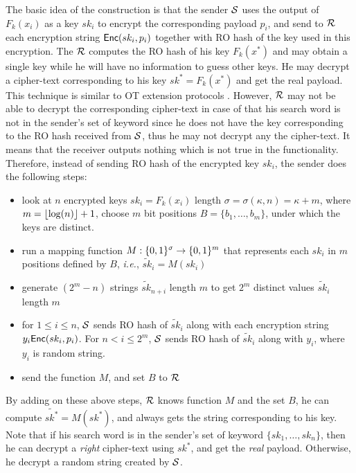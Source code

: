 The basic idea of the \SSOT construction is that the sender $\mathcal{S}$ uses the output of $F_k(x_i)$ as a key $sk_i$ to encrypt the corresponding payload $p_i$, and send to $\mathcal{R}$ each encryption string $\mathsf{Enc}(sk_i,p_i)$ together with RO hash of the key used in this encryption.  The $\mathcal{R}$ computes the RO hash of his key $F_k(x^*)$ and may obtain a single key while he will have no information to guess other keys. He may decrypt a cipher-text corresponding to his key $sk^*=F_k(x^*)$ and get the real payload.   This technique is similar to OT extension protocols  \cite{C:IKNP03,C:KolKum13}. However, $\mathcal{R}$ may not be able to decrypt the corresponding cipher-text in case of that his search word is not in the sender's set of keyword since he does not have the key corresponding to the RO hash received from $\mathcal{S}$, thus he may not decrypt any the cipher-text. It means that the receiver outputs nothing which is not true in the \SSOT functionality. Therefore, instead of sending RO hash of the encrypted key $sk_i$, the sender does the following steps:
\begin{itemize}
	\item look at $n$ encrypted keys $sk_i=F_k(x_i)$ length $\sigma=\sigma(\kappa,n)=\kappa+m$, where $m={\lfloor{\log(n)}\rfloor}+1$, choose $m$ bit positions $B=\{b_1,  \ldots, b_m\}$, under which the keys are distinct.%
	\item run a mapping function $M: \{0,1\}^\sigma \rightarrow \{0,1\}^m$ that represents each $sk_i$ in $m$ positions defined by $B$, \textit{i.e.}, $\tilde{sk}_{i}=M(sk_i)$
	\item generate $(2^m-n)$ strings $\tilde{sk}_{n+i}$ length $m$ to get $2^m$ distinct values $\tilde{sk}_{i}$ length $m$
	\item for $1\leq i \leq n$, $\mathcal{S}$ sends RO hash of $\tilde{sk}_{i}$ along with each encryption string $y_i\mathsf{Enc}(sk_i,p_i)$. For $n < i \leq 2^m$, $\mathcal{S}$ sends RO hash of $\tilde{sk}_{i}$ along with $y_i$, where $y_i$ is random string.
	\item send the function $M$, and set $B$	to $\mathcal{R}$
\end{itemize}


By adding on these above steps, $\mathcal{R}$ knows function $M$ and the set $B$, he can compute $\tilde{sk^*}=M(sk^*)$, and always gets the string corresponding to his key. Note that if his search word is in the sender's set of keyword $\{sk_1, \ldots , sk_n\}$, then he can decrypt a \textit{right} cipher-text using $sk^*$, and get the \textit{real} payload. Otherwise, he decrypt a random string created by $\mathcal{S}$.


